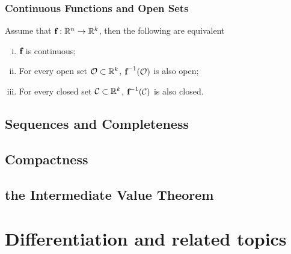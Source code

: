 \documentclass[11pt]{article}
\newcommand{\vef}[0]{\ve{f}}
\begin{document}
			\subsubsection{Continuous Functions and Open Sets}
				\begin{theorem}
					Assume that $\vef: \R^n \to \R^k$, then the following are equivalent
					\begin{enumerate}[(i)]
						\item $\vef$ is continuous;
						\item For every open set $\mathcal{{O}} \subset \mathbb{R}^k$, $\vef^{-1}(\mc{O})$ is also open;
						\item For every closed set $\mathcal{{C}} \subset \mathbb{R}^k$, $\vef^{-1}(\mc{C})$ is also closed.
					\end{enumerate}
				\end{theorem}
		\subsection{Sequences and Completeness}
		    \begin{theorem}
		        
		    \end{theorem}
		    \begin{definition}
		        
		    \end{definition}
		\subsection{Compactness}
		\subsection{the Intermediate Value Theorem}
	\section{Differentiation and related topics}
		\subsection{}
		\subsection{}
		\subsection{}
		\subsection{}
\end{document}
